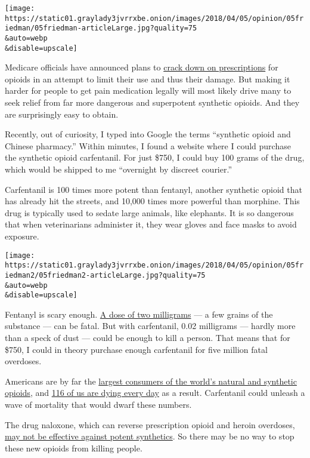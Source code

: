\texttt{[image: https://static01.graylady3jvrrxbe.onion/images/2018/04/05/opinion/05friedman/05friedman-articleLarge.jpg?quality=75\\\&auto=webp\\\&disable=upscale]}

Medicare officials have announced plans to
\href{https://www.nytimes3xbfgragh.onion/2018/03/27/health/opioids-medicare-limits.html}{crack
down on prescriptions} for opioids in an attempt to limit their use and
thus their damage. But making it harder for people to get pain
medication legally will most likely drive many to seek relief from far
more dangerous and superpotent synthetic opioids. And they are
surprisingly easy to obtain.

Recently, out of curiosity, I typed into Google the terms ``synthetic
opioid and Chinese pharmacy.'' Within minutes, I found a website where I
could purchase the synthetic opioid carfentanil. For just \$750, I could
buy 100 grams of the drug, which would be shipped to me ``overnight by
discreet courier.''

Carfentanil is 100 times more potent than fentanyl, another synthetic
opioid that has already hit the streets, and 10,000 times more powerful
than morphine. This drug is typically used to sedate large animals, like
elephants. It is so dangerous that when veterinarians administer it,
they wear gloves and face masks to avoid exposure.

\texttt{[image: https://static01.graylady3jvrrxbe.onion/images/2018/04/05/opinion/05friedman2/05friedman2-articleLarge.jpg?quality=75\\\&auto=webp\\\&disable=upscale]}

Fentanyl is scary enough.
\href{http://www.sciencemag.org/news/2017/03/underground-labs-china-are-devising-potent-new-opiates-faster-authorities-can-respond}{A
dose of two milligrams} --- a few grains of the substance --- can be
fatal. But with carfentanil, 0.02 milligrams --- hardly more than a
speck of dust --- could be enough to kill a person. That means that for
\$750, I could in theory purchase enough carfentanil for five million
fatal overdoses.

Americans are by far the
\href{https://www.washingtonpost.com/news/wonk/wp/2017/03/15/americans-use-far-more-opioids-than-anyone-else-in-the-world/?utm_term=.3023fbdd455f}{largest
consumers of the world's natural and synthetic opioids}, and
\href{https://www.cdc.gov/drugoverdose/data/statedeaths.html}{116 of us
are dying every day} as a result. Carfentanil could unleash a wave of
mortality that would dwarf these numbers.

The drug naloxone, which can reverse prescription opioid and heroin
overdoses,
\href{http://www.nejm.org/doi/full/10.1056/NEJMsr1706626\#article_references}{may
not be effective against potent synthetics}. So there may be no way to
stop these new opioids from killing people.

